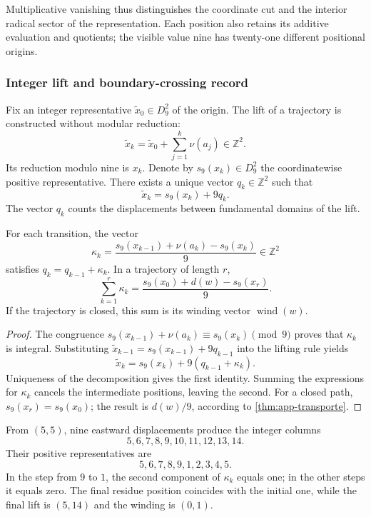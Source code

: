 Multiplicative vanishing thus distinguishes the coordinate cut and the interior radical sector of the representation. Each position also retains its additive evaluation and quotients; the visible value nine has twenty-one different positional origins.

\subsubsection{Integer lift and boundary-crossing record}

Fix an integer representative $\widetilde x_0\in D_9^2$ of the origin. The lift of a trajectory is constructed without modular reduction:
\[
 \widetilde x_k=\widetilde x_0+\sum_{j=1}^{k}\nu(a_j)
 \in\mathbb Z^2.
\]
Its reduction modulo nine is $x_k$. Denote by $s_9(x_k)\in D_9^2$ the coordinatewise positive representative. There exists a unique vector $q_k\in\mathbb Z^2$ such that
\[
 \widetilde x_k=s_9(x_k)+9q_k.
\]
The vector $q_k$ counts the displacements between fundamental domains of the lift.

\begin{proposicion}
\label{geo:prop-cruces}
For each transition, the vector
\[
 \kappa_k=
 \frac{s_9(x_{k-1})+\nu(a_k)-s_9(x_k)}9
 \in\mathbb Z^2
\]
satisfies $q_k=q_{k-1}+\kappa_k$. In a trajectory of length $r$,
\[
 \sum_{k=1}^{r}\kappa_k
 =\frac{s_9(x_0)+d(w)-s_9(x_r)}9.
\]
If the trajectory is closed, this sum is its winding vector $\operatorname{wind}(w)$.
\end{proposicion}

\begin{proof}
The congruence $s_9(x_{k-1})+\nu(a_k)\equiv s_9(x_k)\pmod9$ proves that $\kappa_k$ is integral. Substituting $\widetilde x_{k-1}=s_9(x_{k-1})+9q_{k-1}$ into the lifting rule yields
\[
 \widetilde x_k=s_9(x_k)+9(q_{k-1}+\kappa_k).
\]
Uniqueness of the decomposition gives the first identity. Summing the expressions for $\kappa_k$ cancels the intermediate positions, leaving the second. For a closed path, $s_9(x_r)=s_9(x_0)$; the result is $d(w)/9$, according to \cref{thm:app-transporte}.
\end{proof}

\begin{ejemplo}
From $(5,5)$, nine eastward displacements produce the integer columns
\[
 5,6,7,8,9,10,11,12,13,14.
\]
Their positive representatives are
\[
 5,6,7,8,9,1,2,3,4,5.
\]
In the step from $9$ to $1$, the second component of $\kappa_k$ equals one; in the other steps it equals zero. The final residue position coincides with the initial one, while the final lift is $(5,14)$ and the winding is $(0,1)$.
\end{ejemplo}

